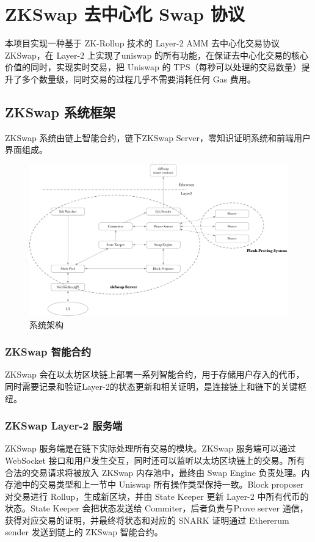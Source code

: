 \documentclass[]{template/llncs}
\begin{document}
\section{ZKSwap 去中心化 Swap 协议}

本项目实现一种基于 ZK-Rollup 技术的 Layer-2 AMM 去中心化交易协议 ZKSwap，在 Layer-2 上实现了uniswap 的所有功能，在保证去中心化交易的核心价值的同时，实现实时交易，把 Uniswap 的 TPS（每秒可以处理的交易数量）提升了多个数量级，同时交易的过程几乎不需要消耗任何 Gas 费用。

\subsection{ZKSwap 系统框架}

ZKSwap 系统由链上智能合约，链下ZKSwap Server，零知识证明系统和前端用户界面组成。

\begin{figure}[htbp]
\centering
\includegraphics[width=0.9\columnwidth]{figure/arch}
\caption{系统架构}
\label{fig:arch}
\end{figure}

\subsubsection{ZKSwap 智能合约}

ZKSwap 会在以太坊区块链上部署一系列智能合约，用于存储用户存入的代币，同时需要记录和验证Layer-2的状态更新和相关证明，是连接链上和链下的关键枢纽。

\subsubsection{ZKSwap Layer-2 服务端}

ZKSwap 服务端是在链下实际处理所有交易的模块。ZKSwap 服务端可以通过 WebSocket 接口和用户发生交互，同时还可以监听以太坊区块链上的交易。所有合法的交易请求将被放入 ZKSwap 内存池中，最终由 Swap Engine 负责处理。内存池中的交易类型和上一节中 Uniswap 所有操作类型保持一致。Block proposer 对交易进行 Rollup，生成新区块，并由 State Keeper 更新 Layer-2 中所有代币的状态。State Keeper 会把状态发送给 Commiter，后者负责与Prove server 通信，获得对应交易的证明，并最终将状态和对应的 SNARK 证明通过 Ethererum sender 发送到链上的 ZKSwap 智能合约。
\end{document}
